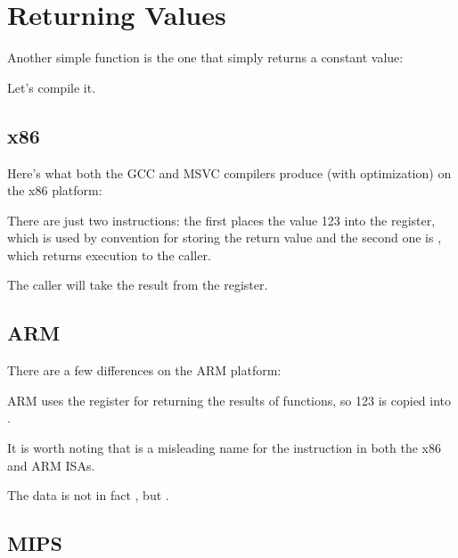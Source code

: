 \section{Returning Values}
\label{ret_val_func}

Another simple function is the one that simply returns a constant value:



Let's compile it.

\subsection{x86}

Here's what both the GCC and MSVC compilers produce (with optimization) on the x86 platform:



There are just two instructions: the first places the value 123 into the \EAX register,
which is used by convention for storing the return
value and the second one is \RET, which returns execution to the \gls{caller}.

The caller will take the result from the \EAX register.

\subsection{ARM}

There are a few differences on the ARM platform:



ARM uses the register  for returning the results of functions, so 123 is copied into .

It is worth noting that \MOV is a misleading name for the instruction in both the x86 and ARM \ac{ISA}s.

The data is not in fact , but .

\subsection{MIPS}

\label{MIPS_leaf_function_ex1}

